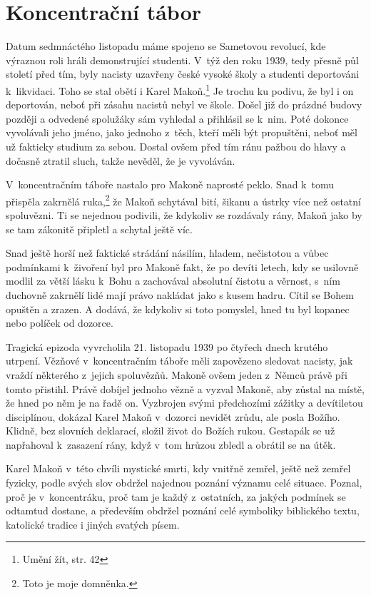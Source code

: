 \section{Koncentrační tábor}

Datum sedmnáctého listopadu máme spojeno se Sametovou revolucí, kde výraznou
roli hráli demonstrující studenti. V~týž den roku 1939, tedy
přesně půl století před tím, byly nacisty uzavřeny české vysoké školy a studenti
deportováni k~likvidaci. Toho se stal obětí i Karel Makoň.\footnote{Umění žít,
str. 42} Je trochu ku podivu,
že byl i on deportován, neboť při zásahu nacistů nebyl ve škole. Došel již do
prázdné budovy později a odvedené spolužáky sám vyhledal a přihlásil se k~nim.
Poté dokonce vyvolávali jeho jméno, jako jednoho z~těch, kteří měli být
propuštěni, neboť měl už fakticky studium za sebou. Dostal ovšem před tím ránu
pažbou do hlavy a dočasně ztratil sluch, takže nevěděl, že je
vyvoláván.

V~koncentračním táboře nastalo pro Makoně naprosté peklo. Snad k~tomu přispěla
zakrnělá ruka,\footnote{Toto je moje domněnka.} že Makoň schytával bití,
šikanu a ústrky více než ostatní spoluvězni. Ti se nejednou podivili, že
kdykoliv se rozdávaly rány, Makoň jako by se tam zákonitě připletl a schytal
ještě víc.

Snad ještě horší než faktické strádání násilím, hladem, nečistotou a vůbec
podmínkami k~živoření byl pro Makoně fakt, že po devíti letech,
kdy se usilovně modlil za větší lásku k~Bohu a zachovával absolutní čistotu a
věrnost, s~ním duchovně zakrnělí lidé mají právo nakládat jako s kusem hadru.
Cítil se Bohem opuštěn a zrazen. A dodává, že kdykoliv si toto pomyslel, hned tu
byl kopanec nebo políček od dozorce.

Tragická epizoda vyvrcholila 21. listopadu 1939 po čtyřech dnech krutého utrpení. Vězňové
v~koncentračním táboře měli zapovězeno sledovat nacisty, jak vraždí některého
z~jejich spoluvězňů. Makoně ovšem jeden z~Němců právě při tomto přistihl. Právě
dobíjel jednoho vězně a vyzval Makoně, aby zůstal na místě, že hned po něm je na
řadě on. Vyzbrojen svými předchozími zážitky a devítiletou disciplínou, dokázal
Karel Makoň v~dozorci nevidět zrůdu, ale posla Božího. Klidně, bez slovních deklarací,
složil život do Božích rukou. Gestapák se už napřahoval k~zasazení rány, když
v~tom hrůzou zbledl a obrátil se na útěk.

Karel Makoň v~této chvíli mystické smrti, kdy vnitřně zemřel, ještě než zemřel
fyzicky, podle svých slov obdržel najednou poznání významu celé situace. Poznal,
proč je v~koncentráku, proč tam je každý z~ostatních, za jakých podmínek se
odtamtud dostane, a především obdržel poznání celé symboliky biblického textu,
katolické tradice i jiných svatých písem.

